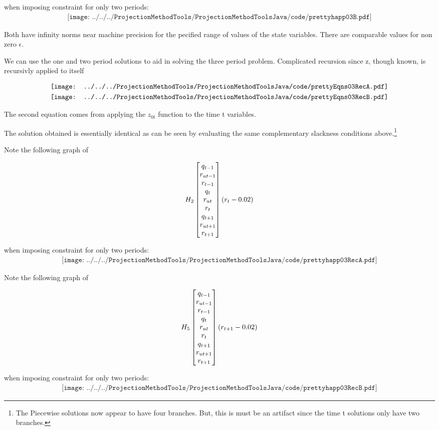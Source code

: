   when imposing constraint for only two periods:
 \begin{gather*}
 \texttt{[image: ../../../ProjectionMethodTools/ProjectionMethodToolsJava/code/prettyhapp03B.pdf]}
 \end{gather*}


Both have infinity norms near machine precision for the pecified range of values of the state variables.  There are comparable values for non zero $\epsilon$.


We can use the one and two period solutions to aid in solving the three period problem.
Complicated recursion since z, though known, is recursivly applied to itself


\begin{gather*}
  \vcenter{\hbox{\texttt{[image: ../../../ProjectionMethodTools/ProjectionMethodToolsJava/code/prettyEqns03RecA.pdf]}}}\\
  \vcenter{\hbox{\texttt{[image: ../../../ProjectionMethodTools/ProjectionMethodToolsJava/code/prettyEqns03RecB.pdf]}}}\\
\end{gather*}

The second equation comes from applying the $z_{0t}$ function to the time t variables.


The solution obtained is essentially identical as can be seen by evaluating the
same complementary slackness conditions above.\footnote{The Piecewise solutions now appear to have four branches.  But, this
 is must be an artifact since the time t solutions only have two branches.}


 Note the following graph of 

 \begin{gather*}
 H_{2}\begin{bmatrix} q_{t-1}\\r_{ut-1}\\r_{t-1}\\ q_{t}\\r_{ut}\\r_{t}\\ q_{t+1}\\r_{ut+1}\\r_{t+1} \end{bmatrix} ( r_t-0.02)
 \end{gather*}

  when imposing constraint for only two periods:
 \begin{gather*}
 \texttt{[image: ../../../ProjectionMethodTools/ProjectionMethodToolsJava/code/prettyhapp03RecA.pdf]}
 \end{gather*}


 Note the following graph of 

 \begin{gather*}
 H_{5}\begin{bmatrix} q_{t-1}\\r_{ut-1}\\r_{t-1}\\ q_{t}\\r_{ut}\\r_{t}\\ q_{t+1}\\r_{ut+1}\\r_{t+1} \end{bmatrix}( r_{t+1}-0.02)
 \end{gather*}

  when imposing constraint for only two periods:
 \begin{gather*}
 \texttt{[image: ../../../ProjectionMethodTools/ProjectionMethodToolsJava/code/prettyhapp03RecB.pdf]}
 \end{gather*}
